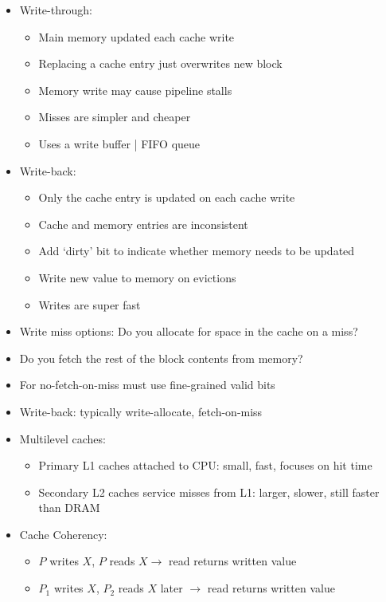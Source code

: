 \documentclass[landscape,10pt]{article}
\begin{document}
\begin{multicols}{2}
\begin{itemize}
\begin{itemize}
    \end{itemize}
    \item[] Write-through:
    \begin{itemize}
        \item[] Main memory updated each cache write
        \item[] Replacing a cache entry just overwrites new block
        \item[] Memory write may cause pipeline stalls
        \item[] Misses are simpler and cheaper
        \item[] Uses a write buffer | FIFO queue
    \end{itemize}
    \item[] Write-back:
    \begin{itemize}
        \item[] Only the cache entry is updated on each cache write
        \item[] Cache and memory entries are inconsistent
        \item[] Add `dirty' bit to indicate whether memory needs to be updated
        \item[] Write new value to memory on evictions
        \item[] Writes are super fast
    \end{itemize}
    \item[] Write miss options: Do you allocate for space in the cache on a miss?
    \item[] Do you fetch the rest of the block contents from memory?
    \item[] For no-fetch-on-miss must use fine-grained valid bits
    \item[] Write-back: typically write-allocate, fetch-on-miss
    \item[] Multilevel caches:
    \begin{itemize}
        \item[] Primary L1 caches attached to CPU: small, fast, focuses on hit time
        \item[] Secondary L2 caches service misses from L1: larger, slower, still faster than DRAM
    \end{itemize}
    \item[] Cache Coherency:
    \begin{itemize}
        \item[] \(P\) writes \(X\), \(P\) reads \(X \rightarrow \) read returns written value
        \item[] \(P_1\) writes \(X\), \(P_2\) reads \(X\) later \(\rightarrow \) read returns written value

\end{itemize}
\end{itemize}
\end{multicols}
\end{document}
